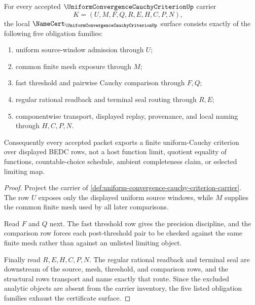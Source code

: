 \begin{theorem}
\label{thm:uniform-convergence-cauchy-criterion-namecert-obligations}
For every accepted $\UniformConvergenceCauchyCriterionUp$ carrier
$$
K=(U,M,F,Q,R,E,H,C,P,N),
$$
the local $\NameCert_{\UniformConvergenceCauchyCriterionUp}$ surface consists exactly of the following five obligation families:
\begin{enumerate}
\item uniform source-window admission through $U$;
\item common finite mesh exposure through $M$;
\item fast threshold and pairwise Cauchy comparison through $F,Q$;
\item regular rational readback and terminal seal routing through $R,E$;
\item componentwise transport, displayed replay, provenance, and local naming through $H,C,P,N$.
\end{enumerate}
Consequently every accepted packet exports a finite uniform-Cauchy criterion over displayed BEDC rows, not a host function limit, quotient equality of functions, countable-choice schedule, ambient completeness claim, or selected limiting map.
\end{theorem}
\begin{proof}
Project the carrier of \autoref{def:uniform-convergence-cauchy-criterion-carrier}. The row $U$ exposes only the displayed uniform source windows, while $M$ supplies the common finite mesh used by all later comparisons.

Read $F$ and $Q$ next. The fast threshold row gives the precision discipline, and the comparison row forces each post-threshold pair to be checked against the same finite mesh rather than against an unlisted limiting object.

Finally read $R,E,H,C,P,N$. The regular rational readback and terminal seal are downstream of the source, mesh, threshold, and comparison rows, and the structural rows transport and name exactly that route. Since the excluded analytic objects are absent from the carrier inventory, the five listed obligation families exhaust the certificate surface.
\end{proof}


